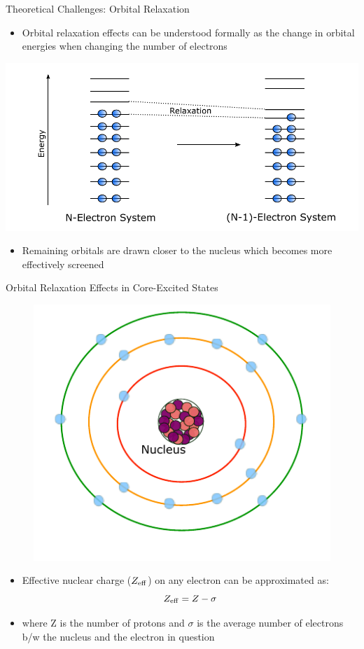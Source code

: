 \documentclass[t]{beamer}
\begin{document}
\begin{frame}{Theoretical Challenges: Orbital Relaxation}
\begin{itemize}
\item Orbital relaxation effects can be understood formally as the change in orbital energies when changing the number of electrons
\end{itemize}
\centering
\includegraphics[width=0.8\linewidth]{orbital_relaxation_diagram.pdf}
\begin{itemize}
\item Remaining orbitals are drawn closer to the nucleus which becomes more effectively screened
\end{itemize}
\end{frame}

\begin{frame}{Orbital Relaxation Effects in Core-Excited States}
\begin{figure}[!t]
\includegraphics[scale=0.7]{core_hole_generation_1.pdf}
\end{figure}
\begin{itemize}
\item Effective nuclear charge ($Z_{\rm eff}$) on any electron can be approximated as:
\begin{equation}
Z_{\rm eff} = Z - \sigma
\end{equation}
\item where Z is the number of protons and $\sigma$ is the average number of electrons b/w the nucleus and the electron in question
\end{itemize}
\end{frame}
\end{document}
